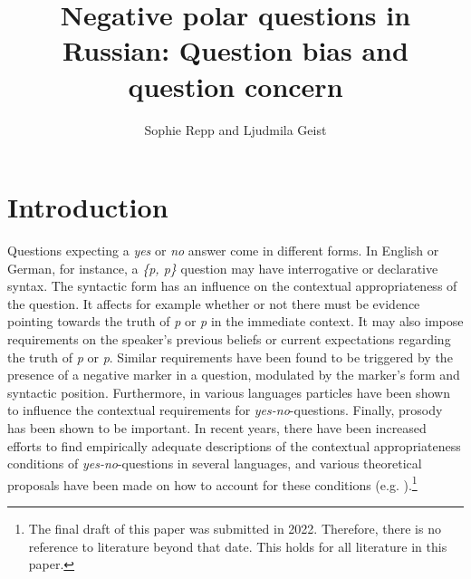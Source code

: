 \documentclass[output=paper,colorlinks,citecolor=brown]{langscibook}
\author{Sophie Repp\orcid{0000-0003-1575-4553}\affiliation{University of Cologne} and Ljudmila Geist\orcid{0000-0001-7907-4958}\affiliation{University of Stuttgart}}
\title{Negative polar questions in Russian: Question bias and question concern}
\begin{document}
\maketitle

\section{Introduction}\label{sec:05:1}
Questions expecting a \textit{yes} or \textit{no} answer come in different forms. In English or German, for instance, a \textit{\{p, \neg p\}} question may have interrogative or declarative syntax. The syntactic form has an influence on the contextual appropriateness of the question. It affects for example whether or not there must be evidence pointing towards the truth of \textit{p} or \textit{\neg p} in the immediate context. It may also impose requirements on the speaker's previous beliefs or current expectations regarding the truth of \textit{p} or \textit{\neg p}. Similar requirements have been found to be triggered by the presence of a negative marker in a question, modulated by the marker's form and syntactic position. Furthermore, in various languages particles have been shown to influence the contextual requirements for \textit{yes-no}-questions. Finally, prosody has been shown to be important. In recent years, there have been increased efforts to find empirically adequate descriptions of the contextual appropriateness conditions of \textit{yes-no}-questions in several languages, and various theoretical proposals have been made on how to account for these conditions (e.g. \citealt{Ladd1981, BueGun2000, gunlogson03, gunlogson08, Rooy2003, romerohan2004negative, Safarova05, repp_negation_2009, Repp13, anderbois_issues_2011, anderbois2019, northrup2014, trinh11, Trinh2014, Malamud2015, Romero15, Seeliger15, Seeliger2019Swedish, Domaneschi17, farkas17, Krifka15, krifka17, gaertner+gyuris17, gyuris17, westera17, westera18, goodhue2018, Goodhue2019, goodhue21:lsa, jeong18, rudin18, Seeliger18, silk20, romero_form_2020, arnhold2021}).\footnote{The final draft of this paper was submitted in 2022. Therefore, there is no reference to literature beyond that date. This holds for all literature in this paper.}
\end{document}
